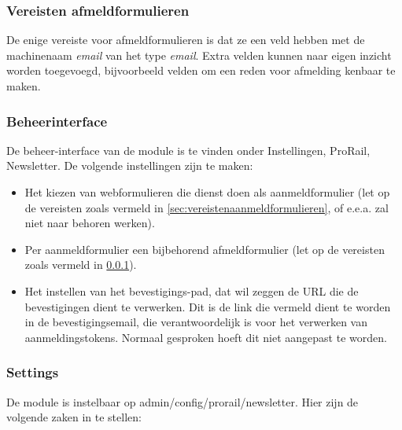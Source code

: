 \subsubsection{Vereisten afmeldformulieren}
\label{sec:vereistenafmeldformulieren}
De enige vereiste voor afmeldformulieren is dat ze een veld hebben met de 
machinenaam \emph{email} van het type \emph{email}. Extra velden kunnen naar 
eigen inzicht worden toegevoegd, bijvoorbeeld velden om een reden voor afmelding 
kenbaar te maken.

\subsubsection{Beheerinterface}
De beheer-interface van de module is te vinden onder Instellingen, ProRail, 
Newsletter.
De volgende instellingen zijn te maken:

\begin{itemize}
\item Het kiezen van webformulieren die dienst doen als aanmeldformulier (let op de vereisten 
zoals vermeld in \ref{sec:vereistenaanmeldformulieren}, of e.e.a. zal niet naar 
behoren werken).
\item Per aanmeldformulier een bijbehorend afmeldformulier (let op de vereisten 
zoals vermeld in \ref{sec:vereistenafmeldformulieren}).
\item Het instellen van het bevestigings-pad, dat wil zeggen de URL die de 
bevestigingen dient te verwerken. Dit is de link die vermeld dient te worden in de 
bevestigingsemail, die verantwoordelijk is voor het verwerken van aanmeldingstokens. 
Normaal gesproken hoeft dit niet aangepast te worden.
\end{itemize}

\subsubsection{Settings}

De module is instelbaar op admin/config/prorail/newsletter. Hier zijn de volgende zaken in te stellen:

